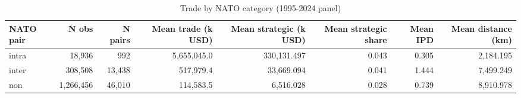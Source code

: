 \begin{table}[!h]
\centering
\caption{\label{tab:tab:by_nato}Trade by NATO category (1995-2024 panel)}
\centering
\begin{tabular}[t]{lrrrrrrr}
\toprule
NATO pair & N obs & N pairs & Mean trade (k USD) & Mean strategic (k USD) & Mean strategic share & Mean IPD & Mean distance (km)\\
\midrule
intra & 18,936 & 992 & 5,655,045.0 & 330,131.497 & 0.043 & 0.305 & 2,184.195\\
inter & 308,508 & 13,438 & 517,979.4 & 33,669.094 & 0.041 & 1.444 & 7,499.249\\
non & 1,266,456 & 46,010 & 114,583.5 & 6,516.028 & 0.028 & 0.739 & 8,910.978\\
\bottomrule
\end{tabular}
\end{table}

